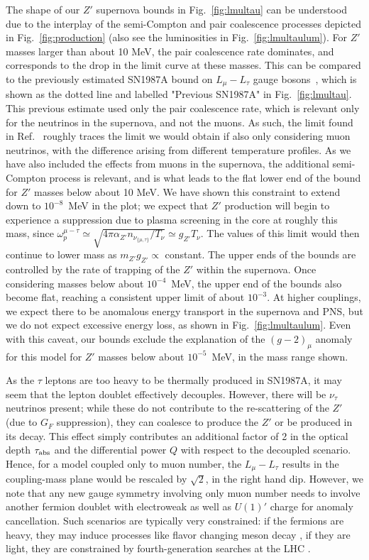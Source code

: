 \documentclass[11pt]{article}
\begin{document}
The shape of our $Z'$ supernova bounds in Fig.~\ref{fig:lmultau} can be understood due to the interplay of the semi-Compton and pair coalescence processes depicted in Fig.~\ref{fig:production} (also see the luminosities in Fig.~\ref{fig:lmultaulum}). For $Z'$ masses larger than about 10 MeV, the pair coalescence rate dominates, and corresponds to the drop in the limit curve at these masses. This can be compared to the previously estimated SN1987A bound on $L_\mu-L_\tau$ gauge bosons~\cite{Escudero:2019gzq}, which is shown as the dotted line and labelled "Previous SN1987A" in Fig.~\ref{fig:lmultau}. This previous estimate used only the pair coalescence rate, which is relevant only for the neutrinos in the supernova, and not the muons.
As such, the limit found in Ref.~\cite{Escudero:2019gzq} roughly traces the limit we would obtain if also only considering muon neutrinos, with the difference arising from different temperature profiles. As we have also included the effects from muons in the supernova, the additional semi-Compton process is relevant, and is what leads to the flat lower end of the bound for $Z'$ masses below about 10 MeV. We have shown this constraint to extend down to $10^{-8}$~MeV in the plot; we expect that $Z'$ production will begin to experience a suppression due to plasma screening in the core at roughly this mass, since $\omega_p^{\mu-\tau} \simeq \sqrt{4\pi \alpha_{Z'} n_{\nu_{ \{ \mu,\tau \} }}/T_\nu} \simeq g_{Z'} T_\nu$. The values of this limit would then continue to lower mass as $m_{Z'} g_{Z'} \propto$ constant. The upper ends of the bounds are controlled by the rate of trapping of the $Z'$ within the supernova. Once considering masses below about $10^{-4}$~MeV, the upper end of the bounds also become flat, reaching a consistent upper limit of about $10^{-3}$. At higher couplings, we expect there to be anomalous energy transport in the supernova and PNS, but we do not expect excessive energy loss, as shown in Fig.~\ref{fig:lmultaulum}. Even with this caveat, our bounds exclude the explanation of the $(g-2)_\mu$ anomaly for this model for $Z'$ masses below about $10^{-5}$~MeV, in the mass range shown.


As the $\tau$ leptons are too heavy to be thermally produced in SN1987A, it may seem that the lepton doublet effectively decouples. However, there will be $\nu_\tau$ neutrinos present; while these do not contribute to the re-scattering of the $Z'$ (due to $G_F$ suppression), they can coalesce to produce the $Z'$ or be produced in its decay. This effect simply contributes an additional factor of 2 in the optical depth $\tau_{\rm abs}$ and the differential power $Q$ with respect to the decoupled scenario. Hence, for a model coupled only to muon number, the $L_\mu-L_\tau$ results in the coupling-mass plane would be rescaled by $\sqrt{2}$, in the right hand dip.
%
However, we note that any new gauge symmetry involving only muon number needs to involve another fermion doublet with electroweak as well as $U(1)'$ charge for anomaly cancellation. Such scenarios are typically very constrained: if the fermions are heavy, they may induce processes like flavor changing meson decay \cite{Dror:2017ehi,Dror:2017nsg}, if they are light, they are constrained by fourth-generation searches at the LHC \cite{Lenz:2013iha}.
\end{document}
